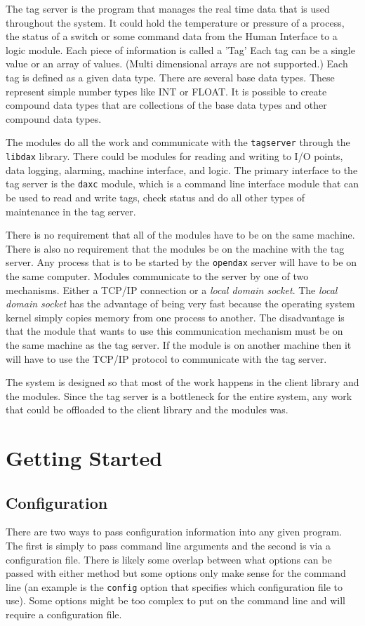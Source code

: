 	The tag server is the program that manages the real time data that is used
	throughout the system.  It could hold the temperature or pressure of a process,
	the status of a switch or some command data from the Human Interface to a logic
	module.  Each piece of information is called a 'Tag'  Each tag can be a single
	value or an array of values.  (Multi dimensional arrays are not supported.) 
	Each tag is defined as a given data type.  There are several base data types.
	These represent simple number types like INT or FLOAT.  It is possible to create
	compound
	data types that are collections of the base data types and other compound data
	types.
	
	The modules do all the work and communicate with the \texttt{tagserver} through
	the \texttt{libdax} library. There could be modules for reading and writing to
	I/O points, data logging, alarming, machine interface, and logic. The primary
	interface to the tag server is the \texttt{daxc} module, which is a command line
	interface module that can
	be used to read and write tags, check status and do all other types of
	maintenance in the tag server.
	
	There is no requirement that all of the modules have to be on the same machine. 
	There is also no requirement that the modules be on the machine with the tag
	server.  Any process that is to be started by the \texttt{opendax} server will
	have to be on the same computer.  Modules communicate to the server by one of
	two mechanisms.  Either a TCP/IP connection or a \textit{local domain socket}. 
	The \textit{local domain socket} has the advantage of being very fast because
	the operating system kernel simply copies memory from one process to another. 
	The disadvantage is that the module that wants to use this communication
	mechanism must be on the same machine as the tag server. If the module is on
	another machine then it will have to use the TCP/IP protocol to communicate with
	the tag server.
	
	The system is designed so that most of the work happens in the client library
	and the modules.  Since the tag
	server is a bottleneck for the entire system, any work that could be offloaded
	to the client library and the
	modules was.
	
	\chapter{Getting Started}
	
	
	\section{Configuration}
	There are two ways to pass configuration information into any given \opendax
	program.  The first is simply to pass command line arguments and the second is
	via a configuration file.  There is likely some overlap between what options can
	be passed with either method but some options only make sense for the command
	line (an example is the \texttt{config} option that specifies which
	configuration file to use).  Some options might be too complex to put on the
	command line and will require a configuration file.
	

